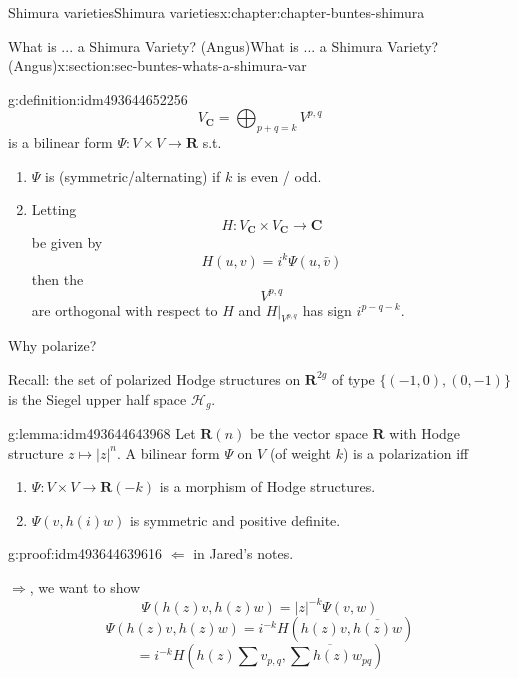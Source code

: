 \documentclass[oneside,10pt,]{book}
\numberwithin{equation}{section}
\newcommand{\RR}{\mathbf{R}}
\newcommand{\CC}{\mathbf{C}}
\begin{document}
\begin{chapterptx}{Shimura varieties}{}{Shimura varieties}{}{}{x:chapter:chapter-buntes-shimura}
\begin{sectionptx}{What is ... a Shimura Variety? (Angus)}{}{What is ... a Shimura Variety? (Angus)}{}{}{x:section:sec-buntes-whats-a-shimura-var}
\begin{definition}{}{g:definition:idm493644652256}
\begin{equation*}
V_\CC = \bigoplus_{p+q = k} V^{p,q}
\end{equation*}
is a bilinear form \(\Psi\colon V\times V \to \RR\) s.t.%
\begin{enumerate}
\item{}\(\Psi\) is (symmetric\slash{}alternating) if \(k\) is even \slash{} odd.%
\item{}Letting%
\begin{equation*}
H\colon V_\CC \times V_\CC \to \CC
\end{equation*}
be given by%
\begin{equation*}
H(u,v) = i^k \Psi(u, \bar v)
\end{equation*}
then the%
\begin{equation*}
V^{p,q}
\end{equation*}
are orthogonal with respect to \(H\) and \(H|_{V^{p,q}}\) has sign \(i^{p-q- k}\).%
\end{enumerate}
%
\end{definition}
Why polarize?%
\par
Recall: the set of polarized Hodge structures on \(\RR^{2g}\) of type \(\{(-1,0), (0,-1)\}\) is the Siegel upper half space \(\mathcal H_g\).%
\begin{lemma}{}{}{g:lemma:idm493644643968}%
Let \(\RR(n) \) be the vector space \(\RR\) with Hodge structure \(z\mapsto |z|^n\). A bilinear form \(\Psi\) on \(V\) (of weight \(k\)) is a polarization iff%
\begin{enumerate}
\item{}\(\Psi\colon V\times V \to \RR(-k)\) is a morphism of  Hodge structures.%
\item{}\(\Psi(v, h(i) w)\) is symmetric and positive definite.%
\end{enumerate}
%
\end{lemma}
\begin{proofptx}{}{g:proof:idm493644639616}
\(\Leftarrow\) in Jared's notes.%
\par
\(\Rightarrow\), we want to show%
\begin{equation*}
\Psi(h(z) v, h(z) w) = |z|^{-k} \Psi(v,w)
\end{equation*}
%
\begin{equation*}
\Psi(h(z) v, h(z) w) = i^{-k} H(h(z) v, \overline{h(z) w})
\end{equation*}
%
\begin{equation*}
=  i^{-k} H(h(z) \sum v_{p,q}, \overline { \sum h(z) w_{pq}})
\end{equation*}
%
\begin{equation*}

\end{equation*}
\end{proofptx}
\end{sectionptx}
\end{chapterptx}
\end{document}
